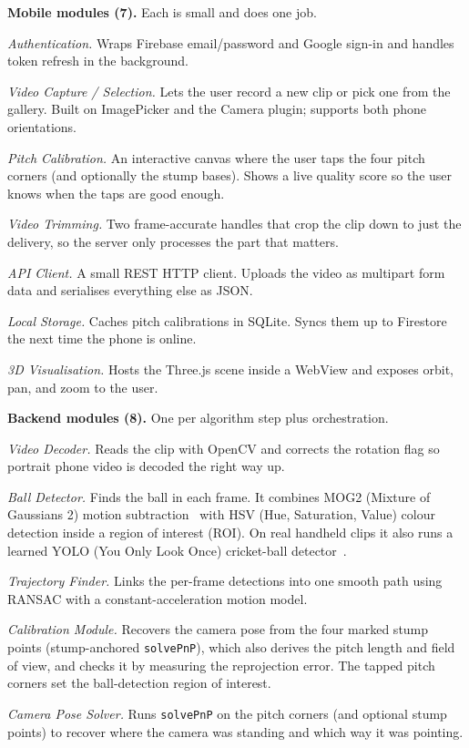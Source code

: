 \documentclass[12pt,a4paper]{report}
\begin{document}
\textbf{Mobile modules (7).} Each is small and does one job.

\emph{Authentication.} Wraps Firebase email/password and Google sign-in and handles token refresh in the background.

\emph{Video Capture / Selection.} Lets the user record a new clip or pick one from the gallery. Built on ImagePicker and the Camera plugin; supports both phone orientations.

\emph{Pitch Calibration.} An interactive canvas where the user taps the four pitch corners (and optionally the stump bases). Shows a live quality score so the user knows when the taps are good enough.

\emph{Video Trimming.} Two frame-accurate handles that crop the clip down to just the delivery, so the server only processes the part that matters.

\emph{API Client.} A small REST HTTP client. Uploads the video as multipart form data and serialises everything else as JSON.

\emph{Local Storage.} Caches pitch calibrations in SQLite. Syncs them up to Firestore the next time the phone is online.

\emph{3D Visualisation.} Hosts the Three.js scene inside a WebView and exposes orbit, pan, and zoom to the user.

\textbf{Backend modules (8).} One per algorithm step plus orchestration.

\emph{Video Decoder.} Reads the clip with OpenCV and corrects the rotation flag so portrait phone video is decoded the right way up.

\emph{Ball Detector.} Finds the ball in each frame. It combines MOG2 (Mixture of Gaussians 2) motion subtraction~\cite{zivkovic2004} with HSV (Hue, Saturation, Value) colour detection inside a region of interest (ROI). On real handheld clips it also runs a learned YOLO (You Only Look Once) cricket-ball detector~\cite{redmon2016,ultralytics2023}.

\emph{Trajectory Finder.} Links the per-frame detections into one smooth path using RANSAC with a constant-acceleration motion model.

\emph{Calibration Module.} Recovers the camera pose from the four marked stump points (stump-anchored \texttt{solvePnP}), which also derives the pitch length and field of view, and checks it by measuring the reprojection error. The tapped pitch corners set the ball-detection region of interest.

\emph{Camera Pose Solver.} Runs \texttt{solvePnP} on the pitch corners (and optional stump points) to recover where the camera was standing and which way it was pointing.
\end{document}
